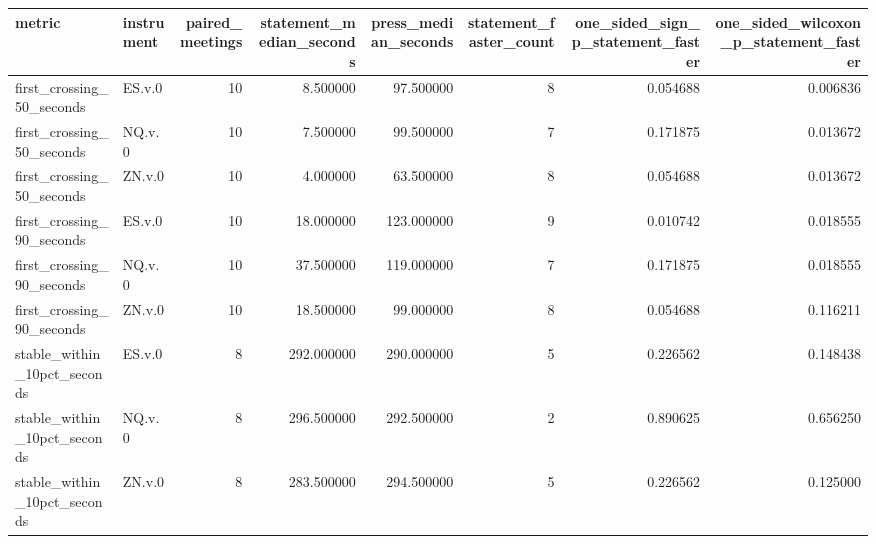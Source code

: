 \begin{tabular}{llrrrrrr}
\toprule
metric & instrument & paired_meetings & statement_median_seconds & press_median_seconds & statement_faster_count & one_sided_sign_p_statement_faster & one_sided_wilcoxon_p_statement_faster \\
\midrule
first_crossing_50_seconds & ES.v.0 & 10 & 8.500000 & 97.500000 & 8 & 0.054688 & 0.006836 \\
first_crossing_50_seconds & NQ.v.0 & 10 & 7.500000 & 99.500000 & 7 & 0.171875 & 0.013672 \\
first_crossing_50_seconds & ZN.v.0 & 10 & 4.000000 & 63.500000 & 8 & 0.054688 & 0.013672 \\
first_crossing_90_seconds & ES.v.0 & 10 & 18.000000 & 123.000000 & 9 & 0.010742 & 0.018555 \\
first_crossing_90_seconds & NQ.v.0 & 10 & 37.500000 & 119.000000 & 7 & 0.171875 & 0.018555 \\
first_crossing_90_seconds & ZN.v.0 & 10 & 18.500000 & 99.000000 & 8 & 0.054688 & 0.116211 \\
stable_within_10pct_seconds & ES.v.0 & 8 & 292.000000 & 290.000000 & 5 & 0.226562 & 0.148438 \\
stable_within_10pct_seconds & NQ.v.0 & 8 & 296.500000 & 292.500000 & 2 & 0.890625 & 0.656250 \\
stable_within_10pct_seconds & ZN.v.0 & 8 & 283.500000 & 294.500000 & 5 & 0.226562 & 0.125000 \\
\bottomrule
\end{tabular}
